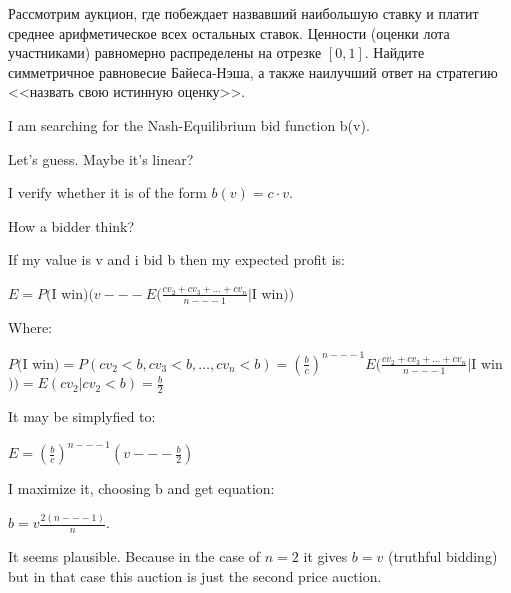 \begin{problem}

Рассмотрим аукцион, где побеждает назвавший наибольшую ставку и платит среднее арифметическое всех остальных ставок. Ценности (оценки лота участниками) равномерно распределены на отрезке $[0,1]$. Найдите симметричное равновесие Байеса-Нэша, а также наилучший ответ на стратегию <<назвать свою истинную оценку>>.

\begin{sol}

I am searching for the Nash-Equilibrium bid function b(v).

Let's guess. Maybe it's linear? \par
I verify whether it is of the form $b(v) = c\cdot v$. \par
How a bidder think? \par

If my value is v and i bid b then my expected profit is:\par
$E = P($I win$)(v --- E(\frac {cv_{2} + cv_{3} + \ldots + cv_{n}}{n --- 1}|$I win$))$ \par
Where:\par
$P($I win$)=P(cv_{2} < b,cv_{3} < b,\ldots,cv_{n} < b)=\left(\frac {b}{c}\right)^{n --- 1}
E(\frac {cv_{2} + cv_{3} + \ldots + cv_{n}}{n --- 1}|$I win$))=E(cv_{2}|cv_{2}<b)=\frac{b}{2}$\par
It may be simplyfied to:\par
$E = \left(\frac {b}{c}\right)^{n --- 1}(v --- \frac {b}{2})$\par
I maximize it, choosing b and get equation: \par
$b = v\frac {2(n --- 1)}{n}$. \par

It seems plausible. Because in the case of $n = 2$ it gives $b = v$ (truthful bidding) but in that case this auction is just the second price auction.
\end{sol}
\end{problem}



